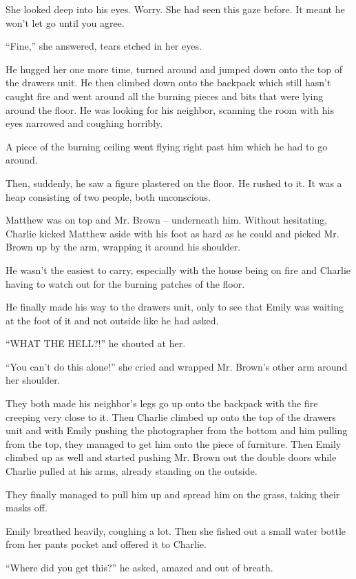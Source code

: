 She looked deep into his eyes. Worry. She had seen this gaze before. It meant he won't let go until you agree.

“Fine,” she answered, tears etched in her eyes.

He hugged her one more time, turned around and jumped down onto the top of the drawers unit. He then climbed down onto the backpack which still hasn't caught fire and went around all the burning pieces and bits that were lying around the floor. He was looking for his neighbor, scanning the room with his eyes narrowed and coughing horribly.

A piece of the burning ceiling went flying right past him which he had to go around.

Then, suddenly, he saw a figure plastered on the floor. He rushed to it. It was a heap consisting of two people, both unconscious.

Matthew was on top and Mr. Brown – underneath him. Without hesitating, Charlie kicked Matthew aside with his foot as hard as he could and picked Mr. Brown up by the arm, wrapping it around his shoulder.

He wasn't the easiest to carry, especially with the house being on fire and Charlie having to watch out for the burning patches of the floor.

He finally made his way to the drawers unit, only to see that Emily was waiting at the foot of it and not outside like he had asked.

“WHAT THE HELL?!” he shouted at her.

“You can't do this alone!” she cried and wrapped Mr. Brown's other arm around her shoulder.

They both made his neighbor's legs go up onto the backpack with the fire creeping very close to it. Then Charlie climbed up onto the top of the drawers unit and with Emily pushing the photographer from the bottom and him pulling from the top, they managed to get him onto the piece of furniture. Then Emily climbed up as well and started pushing Mr. Brown out the double doors while Charlie pulled at his arms, already standing on the outside.

They finally managed to pull him up and spread him on the grass, taking their masks off.

Emily breathed heavily, coughing a lot. Then she fished out a small water bottle from her pants pocket and offered it to Charlie.

“Where did you get this?” he asked, amazed and out of breath.

